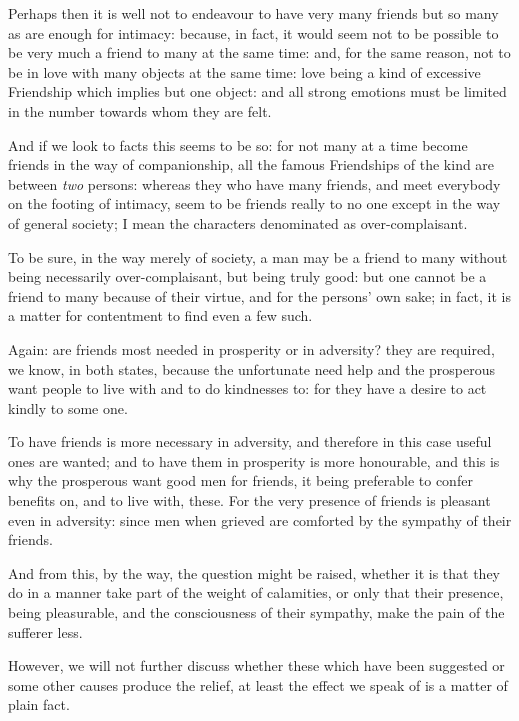 Perhaps then it is well not to endeavour to have very many friends but so many
as are enough for intimacy: because, in fact, it would seem not to be possible
to be very much a friend to many at the same time: and, for the same reason,
not to be in love with many objects at the same time: love being a kind of
excessive Friendship which implies but one object: and all strong emotions must
be limited in the number towards whom they are felt.

And if we look to facts this seems to be so: for not many at a time become
friends in the way of companionship, all the famous Friendships of the kind are
between \emph{two} persons: whereas they who have many friends, and meet
everybody on the footing of intimacy, seem to be friends really to no one
except in the way of general society; I mean the characters denominated as
over-complaisant.

To be sure, in the way merely of society, a man may be a friend to many without
being necessarily over-complaisant, but being truly good: but one cannot be a
friend to many because of their virtue, and for the persons’ own sake; in
fact, it is a matter for contentment to find even a few such.


Again: are friends most needed in prosperity or in adversity? they are
required, we know, in both states, because the unfortunate need help and the
prosperous want people to live with and to do kindnesses to: for they have a
desire to act kindly to some one.

To have friends is more necessary in adversity, and therefore in this case
useful ones are wanted; and to have them in prosperity is more honourable, and
this is why the prosperous want good men for friends, it being preferable to
confer benefits on, and to live with, these. For the very presence of friends
is pleasant even in adversity: since men when grieved are comforted by the
sympathy of their friends.

And from this, by the way, the question might be raised, whether it is that
they do in a manner take part of the weight of calamities, or only that their
presence, being pleasurable, and the consciousness of their sympathy, make the
pain of the sufferer less.

However, we will not further discuss whether these which have been suggested or
some other causes produce the relief, at least the effect we speak of is a
matter of plain fact.

